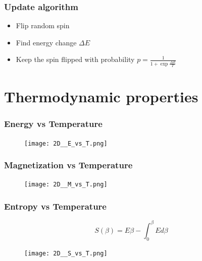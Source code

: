 \documentclass{beamer}
\begin{document}

\begin{frame}
\frametitle{Update algorithm}

\begin{itemize}
\item Flip random spin
\item Find energy change $\Delta E$
\item Keep the spin flipped with probability $p = \frac{1}{1 + \exp{\frac{\Delta E}{T}}}$

\end{itemize}
\end{frame}

\section{Thermodynamic properties}

\begin{frame}
\frametitle{Energy vs Temperature}

\begin{figure}
\texttt{[image: 2D\_\_E\_vs\_T.png]}
\end{figure}

\end{frame}


\begin{frame}
\frametitle{Magnetization vs Temperature}

\begin{figure}
\texttt{[image: 2D\_\_M\_vs\_T.png]}
\end{figure}

\end{frame}


\begin{frame}
\frametitle{Entropy vs Temperature}

$$ S(\beta) = E \beta - \int_0^{\beta} E d\beta $$ 

\begin{figure}
\texttt{[image: 2D\_\_S\_vs\_T.png]}
\end{figure}

\end{frame}

\end{document}
